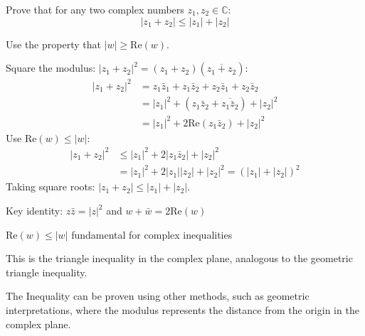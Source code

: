 \begin{problem}
Prove that for any two complex numbers $z_1, z_2 \in \mathbb{C}$:
\[ |z_1 + z_2| \le |z_1| + |z_2| \]
\end{problem}

\begin{hint}
Use the property that $|w| \ge \text{Re}(w)$.
\end{hint}

\begin{solution}
Square the modulus: $|z_1 + z_2|^2 = (z_1 + z_2)(\overline{z_1 + z_2})$:
\begin{align*}
|z_1 + z_2|^2 &= z_1\bar{z}_1 + z_1\bar{z}_2 + z_2\bar{z}_1 + z_2\bar{z}_2\\
&= |z_1|^2 + (z_1\bar{z}_2 + \overline{z_1\bar{z}_2}) + |z_2|^2\\
&= |z_1|^2 + 2\text{Re}(z_1\bar{z}_2) + |z_2|^2
\end{align*}
Use $\text{Re}(w) \le |w|$:
\begin{align*}
|z_1 + z_2|^2 &\le |z_1|^2 + 2|z_1\bar{z}_2| + |z_2|^2\\
&= |z_1|^2 + 2|z_1||z_2| + |z_2|^2 = (|z_1| + |z_2|)^2
\end{align*}
Taking square roots: $|z_1 + z_2| \le |z_1| + |z_2|$.
\end{solution}

\begin{takeaways}
\item Key identity: $z\bar{z} = |z|^2$ and $w + \bar{w} = 2\text{Re}(w)$
\item $\text{Re}(w) \le |w|$ fundamental for complex inequalities
\item This is the triangle inequality in the complex plane, analogous to the geometric triangle inequality.
\item The Inequality can be proven using other methods, such as geometric interpretations, where the modulus represents the distance from the origin in the complex plane.
\end{takeaways}
